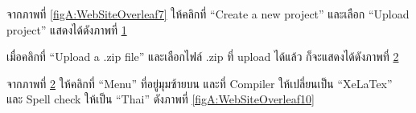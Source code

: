 \begin{mycustomenum2}
    \item จากภาพที่ \ref{figA:WebSiteOverleaf7} ให้คลิกที่ \enquote{Create a new project} และเลือก \enquote{Upload project} แสดงได้ดังภาพที่ \ref{figA:WebSiteOverleaf8}

\begin{figure}[htbp]
\centering
{}
\caption{}
\label{figA:WebSiteOverleaf8}
\end{figure}

    \item เมื่อคลิกที่ \enquote{Upload a .zip file} และเลือกไฟล์ .zip ที่ upload ได้แล้ว ก็จะแสดงได้ดังภาพที่ \ref{figA:WebSiteOverleaf9}

\begin{figure}[htbp]
\centering
{}
\caption{}
\label{figA:WebSiteOverleaf9}
\end{figure}

    \item จากภาพที่ \ref{figA:WebSiteOverleaf9} ให้คลิกที่ \enquote{Menu} ที่อยู่มุมซ้ายบน และที่ Compiler ให้เปลี่ยนเป็น \enquote{XeLaTex} และ Spell check ให้เป็น \enquote{Thai} ดังภาพที่ \ref{figA:WebSiteOverleaf10} 


\end{mycustomenum2}
